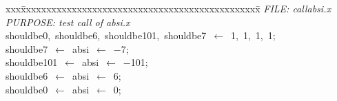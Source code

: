 \documentclass{report}
\begin{document}
\pagestyle{empty}
\begin{tabbing}
xxx\=xxxxxxxxxxxxxxxxxxxxxxxxxxxxxxxxxxxxxxxxxxxxxxx\=\kill
{\tt{}}{\em{} FILE:    callabsi.x
}\\
{\tt{}}{\em{} PURPOSE: test call of absi.x
}\\
shouldbe0,\ shouldbe6,\ shouldbe101,\ shouldbe7\ $\leftarrow$\ 1,\ 1,\ 1,\ 1;\\
shouldbe7\ $\leftarrow$\ absi\ $\leftarrow$\ $-$7;\\
shouldbe101\ $\leftarrow$\ absi\ $\leftarrow$\ $-$101;\\
shouldbe6\ $\leftarrow$\ absi\ $\leftarrow$\ 6;\\
shouldbe0\ $\leftarrow$\ absi\ $\leftarrow$\ 0;\\
\end{tabbing}
\end{document}

